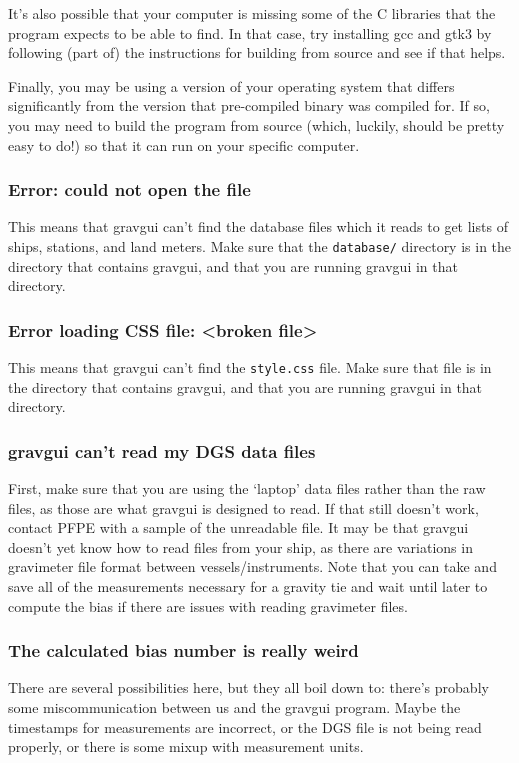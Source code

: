 \documentclass{pfpe-manual}
\begin{document}
It's also possible that your computer is missing some of the C libraries that the program expects to be able to find. In that case, try installing gcc and gtk3 by following (part of) the instructions for building from source and see if that helps.

Finally, you may be using a version of your operating system that differs significantly from the version that pre-compiled binary was compiled for. If so, you may need to build the program from source (which, luckily, should be pretty easy to do!) so that it can run on your specific computer.

\subsubsection{Error: could not open the file}
This means that gravgui can't find the database files which it reads to get lists of ships, stations, and land meters. Make sure that the \texttt{database/} directory is in the directory that contains gravgui, and that you are running gravgui in that directory.

\subsubsection{Error loading CSS file: <broken file>}
This means that gravgui can't find the \texttt{style.css} file. Make sure that file is in the directory that contains gravgui, and that you are running gravgui in that directory.

\subsubsection{gravgui can't read my DGS data files}
First, make sure that you are using the `laptop' data files rather than the raw files, as those are what gravgui is designed to read. If that still doesn't work, contact PFPE with a sample of the unreadable file. It may be that gravgui doesn't yet know how to read files from your ship, as there are variations in gravimeter file format between vessels/instruments. Note that you can take and save all of the measurements necessary for a gravity tie and wait until later to compute the bias if there are issues with reading gravimeter files.

\subsubsection{The calculated bias number is really weird}
There are several possibilities here, but they all boil down to: there's probably some miscommunication between us and the gravgui program. Maybe the timestamps for measurements are incorrect, or the DGS file is not being read properly, or there is some mixup with measurement units. 
\end{document}
